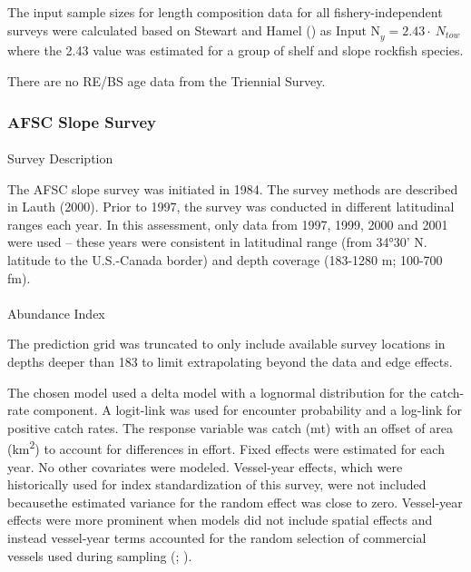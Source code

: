 \documentclass[
]{scrartcl}
\makeatletter
\let\oldparagraph\paragraph
\renewcommand{\paragraph}{
    \@ifstar
      \xxxParagraphStar
      \xxxParagraphNoStar
  }
\newcommand{\xxxParagraphStar}[1]{\oldparagraph*{#1}\mbox{}}
\newcommand{\xxxParagraphNoStar}[1]{\oldparagraph{#1}\mbox{}}
\makeatother
\begin{document}
The input sample sizes for length composition data for all
fishery-independent surveys were calculated based on Stewart and Hamel
() as
\(\text{Input N}_{y} = 2.43\cdot \ N_{tow}\) where the 2.43 value was
estimated for a group of shelf and slope rockfish species.

There are no RE/BS age data from the Triennial Survey.

\subsubsection{AFSC Slope Survey}\label{afsc-slope-survey}

\paragraph{Survey Description}\label{survey-description-2}

The AFSC slope survey was initiated in 1984. The survey methods are
described in Lauth (2000). Prior to 1997, the survey was conducted in
different latitudinal ranges each year. In this assessment, only data
from 1997, 1999, 2000 and 2001 were used -- these years were consistent
in latitudinal range (from 34°30' N. latitude to the U.S.-Canada border)
and depth coverage (183-1280 m; 100-700 fm).

\paragraph{Abundance Index}\label{abundance-index-2}

The prediction grid was truncated to only include available survey
locations in depths deeper than 183 to limit extrapolating beyond the
data and edge effects.

The chosen model used a delta model with a lognormal distribution for
the catch-rate component. A logit-link was used for encounter
probability and a log-link for positive catch rates. The response
variable was catch (mt) with an offset of area (km\textsuperscript{2})
to account for differences in effort. Fixed effects were estimated for
each year. No other covariates were modeled. Vessel-year effects, which
were historically used for index standardization of this survey, were
not included becausethe estimated variance for the random effect was
close to zero. Vessel-year effects were more prominent when models did
not include spatial effects and instead vessel-year terms accounted for
the random selection of commercial vessels used during sampling
(;
).
\end{document}
